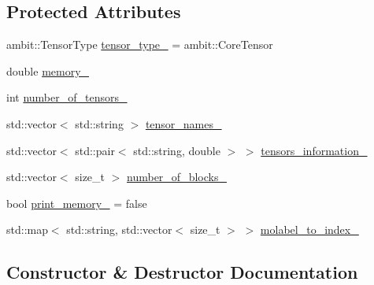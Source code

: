 \subsection*{Protected Attributes}
\begin{DoxyCompactItemize}
\item 
ambit\+::\+Tensor\+Type \mbox{\hyperlink{classforte_1_1_blocked_tensor_factory_a57b7de17cd536996e3ad6dc2e4bc98cd}{tensor\+\_\+type\+\_\+}} = ambit\+::\+Core\+Tensor
\item 
double \mbox{\hyperlink{classforte_1_1_blocked_tensor_factory_aa4d207ff5a6ed05ab002ef3d1b8577c0}{memory\+\_\+}}
\item 
int \mbox{\hyperlink{classforte_1_1_blocked_tensor_factory_ac06f12f97228cb11b65d56e62339a50e}{number\+\_\+of\+\_\+tensors\+\_\+}}
\item 
std\+::vector$<$ std\+::string $>$ \mbox{\hyperlink{classforte_1_1_blocked_tensor_factory_a5765aa6c7d5d136807602db26806c384}{tensor\+\_\+names\+\_\+}}
\item 
std\+::vector$<$ std\+::pair$<$ std\+::string, double $>$ $>$ \mbox{\hyperlink{classforte_1_1_blocked_tensor_factory_a9718510c80ab928097b1db00bc042363}{tensors\+\_\+information\+\_\+}}
\item 
std\+::vector$<$ size\+\_\+t $>$ \mbox{\hyperlink{classforte_1_1_blocked_tensor_factory_a92166317d538805bc5a843ed1e16363f}{number\+\_\+of\+\_\+blocks\+\_\+}}
\item 
bool \mbox{\hyperlink{classforte_1_1_blocked_tensor_factory_a44b9c67b34efc8fe48b6c9c50f1570cb}{print\+\_\+memory\+\_\+}} = false
\item 
std\+::map$<$ std\+::string, std\+::vector$<$ size\+\_\+t $>$ $>$ \mbox{\hyperlink{classforte_1_1_blocked_tensor_factory_a18abab2d711ab3217d77e093072b2701}{molabel\+\_\+to\+\_\+index\+\_\+}}
\end{DoxyCompactItemize}


\subsection{Constructor \& Destructor Documentation}
\mbox{\label{classforte_1_1_blocked_tensor_factory_a4d918bbb012371d84c4c6b09a49137cf}} 
